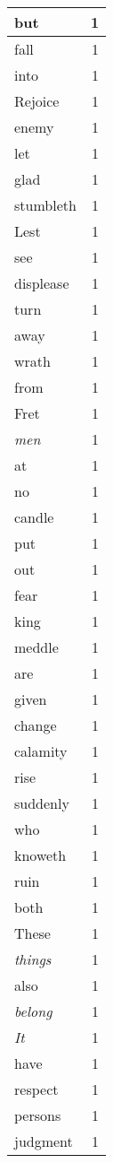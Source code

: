 \begin{center}
\begin{longtable}{l|r}
but & 1\\ \hline 
fall & 1\\ \hline 
into & 1\\ \hline 
Rejoice & 1\\ \hline 
enemy & 1\\ \hline 
let & 1\\ \hline 
glad & 1\\ \hline 
stumbleth & 1\\ \hline 
Lest & 1\\ \hline 
see & 1\\ \hline 
displease & 1\\ \hline 
turn & 1\\ \hline 
away & 1\\ \hline 
wrath & 1\\ \hline 
from & 1\\ \hline 
Fret & 1\\ \hline 
\emph{men} & 1\\ \hline 
at & 1\\ \hline 
no & 1\\ \hline 
candle & 1\\ \hline 
put & 1\\ \hline 
out & 1\\ \hline 
fear & 1\\ \hline 
king & 1\\ \hline 
meddle & 1\\ \hline 
are & 1\\ \hline 
given & 1\\ \hline 
change & 1\\ \hline 
calamity & 1\\ \hline 
rise & 1\\ \hline 
suddenly & 1\\ \hline 
who & 1\\ \hline 
knoweth & 1\\ \hline 
ruin & 1\\ \hline 
both & 1\\ \hline 
These & 1\\ \hline 
\emph{things} & 1\\ \hline 
also & 1\\ \hline 
\emph{belong} & 1\\ \hline 
\emph{It} & 1\\ \hline 
have & 1\\ \hline 
respect & 1\\ \hline 
persons & 1\\ \hline 
judgment & 1\\ \hline 

\end{longtable}
\end{center}
